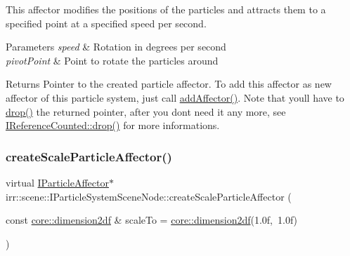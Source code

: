 This affector modifies the positions of the particles and attracts them to a specified point at a specified speed per second. 
\begin{DoxyParams}{Parameters}
{\em speed} & Rotation in degrees per second \\
\hline
{\em pivot\+Point} & Point to rotate the particles around \\
\hline
\end{DoxyParams}
\begin{DoxyReturn}{Returns}
Pointer to the created particle affector. To add this affector as new affector of this particle system, just call \hyperlink{classirr_1_1scene_1_1IParticleSystemSceneNode_a401f5afbbb748878011c5ceb7d447f8b}{add\+Affector()}. Note that you\textquotesingle{}ll have to \hyperlink{classirr_1_1IReferenceCounted_a03856a09355b89d178090c4a5f738543}{drop()} the returned pointer, after you don\textquotesingle{}t need it any more, see \hyperlink{classirr_1_1IReferenceCounted_a03856a09355b89d178090c4a5f738543}{I\+Reference\+Counted\+::drop()} for more informations. 
\end{DoxyReturn}
\mbox{\label{classirr_1_1scene_1_1IParticleSystemSceneNode_a015692bb57e0b6dfff1de96975b3bc74}} 
\subsubsection{\texorpdfstring{create\+Scale\+Particle\+Affector()}{createScaleParticleAffector()}}
{\footnotesize\ttfamily virtual \hyperlink{classirr_1_1scene_1_1IParticleAffector}{I\+Particle\+Affector}$\ast$ irr\+::scene\+::\+I\+Particle\+System\+Scene\+Node\+::create\+Scale\+Particle\+Affector (\begin{DoxyParamCaption}\item[{const \hyperlink{namespaceirr_1_1core_af6dc5c45ff13e7712758c827ff58676b}{core\+::dimension2df} \&}]{scale\+To = {\ttfamily \hyperlink{namespaceirr_1_1core_af6dc5c45ff13e7712758c827ff58676b}{core\+::dimension2df}(1.0f,~1.0f)} }\end{DoxyParamCaption})\hspace{0.3cm}{\ttfamily [pure virtual]}}



